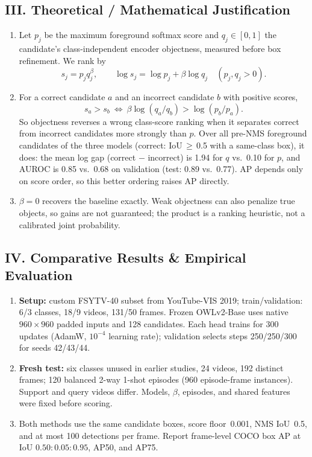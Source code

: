 \documentclass[8pt,a4paper]{article}
\begin{document}
\subsection*{III. Theoretical / Mathematical Justification}
\begin{enumerate}
    \item Let $p_j$ be the maximum foreground softmax score and $q_j\in[0,1]$ the candidate's class-independent encoder objectness, measured before box refinement. We rank by
    \[
    s_j=p_jq_j^{\beta},\qquad \log s_j=\log p_j+\beta\log q_j\quad(p_j,q_j>0).
    \]
    \item For a correct candidate $a$ and an incorrect candidate $b$ with positive scores,
    \[
    s_a>s_b\ \Longleftrightarrow\ \beta\log(q_a/q_b)>\log(p_b/p_a).
    \]
    So objectness reverses a wrong class-score ranking when it separates correct from incorrect candidates more strongly than $p$. Over all pre-NMS foreground candidates of the three models (correct: IoU$\,\geq\,$0.5 with a same-class box), it does: the mean log gap (correct $-$ incorrect) is 1.94 for $q$ vs.\ 0.10 for $p$, and AUROC is 0.85 vs.\ 0.68 on validation (test: 0.89 vs.\ 0.77). AP depends only on score order, so this better ordering raises AP directly.
    \item $\beta=0$ recovers the baseline exactly. Weak objectness can also penalize true objects, so gains are not guaranteed; the product is a ranking heuristic, not a calibrated joint probability.
\end{enumerate}

\subsection*{IV. Comparative Results \& Empirical Evaluation}
\begin{enumerate}
    \item \textbf{Setup:} custom FSYTV-40 subset from YouTube-VIS 2019; train/validation: 6/3 classes, 18/9 videos, 131/50 frames. Frozen OWLv2-Base uses native $960\!\times\!960$ padded inputs and 128 candidates. Each head trains for 300 updates (AdamW, $10^{-4}$ learning rate); validation selects steps 250/250/300 for seeds 42/43/44.
    \item \textbf{Fresh test:} six classes unused in earlier studies, 24 videos, 192 distinct frames; 120 balanced 2-way 1-shot episodes (960 episode-frame instances). Support and query videos differ. Models, $\beta$, episodes, and shared features were fixed before scoring.
    \item Both methods use the same candidate boxes, score floor~0.001, NMS IoU~0.5, and at most 100 detections per frame. Report frame-level COCO box AP at IoU $0.50{:}0.05{:}0.95$, AP50, and AP75.
\end{enumerate}
\end{document}
